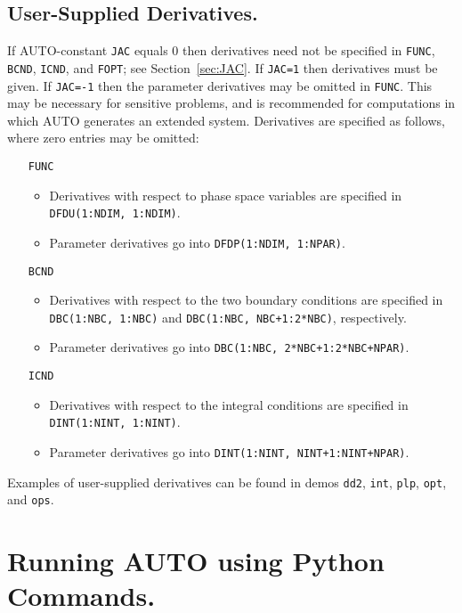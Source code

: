 \documentclass[12pt]{report}
\begin{document}
\section{ User-Supplied Derivatives.} \label{sec:derivatives}
If {\cal AUTO}-constant {\tt JAC} equals 0 
then derivatives need not be specified in 
{\tt FUNC}, {\tt BCND}, {\tt ICND}, and {\tt FOPT}; see Section~\ref{sec:JAC}.
If {\tt JAC=1} then derivatives must be given.
If {\tt JAC=-1} then the parameter derivatives may be omitted in 
{\tt FUNC}.
This may be necessary for sensitive 
problems, and is recommended for computations in which {\cal AUTO} 
generates an extended system.
Derivatives are specified as follows, where zero entries may be
omitted:
\begin{itemize}
\item[{\tt FUNC}]
\begin{itemize}
\item
 Derivatives with respect to phase space variables
  are specified in {\tt DFDU(1:NDIM, 1:NDIM)}.
\item
 Parameter derivatives go into {\tt DFDP(1:NDIM, 1:NPAR)}.
\end{itemize}
\item[{\tt BCND}]
\begin{itemize}
\item
Derivatives with respect to the two boundary conditions
are specified in {\tt DBC(1:NBC, 1:NBC)} and {\tt DBC(1:NBC, NBC+1:2*NBC)},
respectively.
\item
Parameter derivatives go into {\tt DBC(1:NBC, 2*NBC+1:2*NBC+NPAR)}.
\end{itemize}
\item[{\tt ICND}]
\begin{itemize}
\item
Derivatives with respect to the integral conditions
are specified in {\tt DINT(1:NINT, 1:NINT)}.
\item
Parameter derivatives go into {\tt DINT(1:NINT, NINT+1:NINT+NPAR)}.
\end{itemize}
\end{itemize}
Examples of user-supplied derivatives can be found in
demos  {\tt dd2}, {\tt int}, {\tt plp}, {\tt opt}, and {\tt ops}.

\chapter{ Running {\cal AUTO} using Python Commands.} \label{ch:python_mode}
\end{document}
